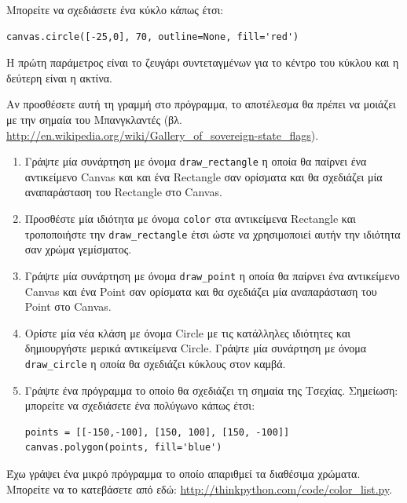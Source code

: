 \documentclass[10pt]{book}
\begin{document}
\begin{exercise}
Μπορείτε να σχεδιάσετε ένα κύκλο κάπως έτσι: 

\begin{verbatim}
canvas.circle([-25,0], 70, outline=None, fill='red')
\end{verbatim}

Η πρώτη παράμετρος είναι το ζευγάρι συντεταγμένων για το κέντρο του κύκλου και η δεύτερη είναι η ακτίνα.

Αν προσθέσετε αυτή τη γραμμή στο πρόγραμμα, το αποτέλεσμα θα πρέπει να μοιάζει με την σημαία του Μπανγκλαντές
(βλ. \url{http://en.wikipedia.org/wiki/Gallery_of_sovereign-state_flags}).


\begin{enumerate}

\item Γράψτε μία συνάρτηση με όνομα \verb"draw_rectangle" η οποία θα παίρνει ένα αντικείμενο Canvas και
  και ένα Rectangle σαν ορίσματα και θα σχεδιάζει μία αναπαράσταση του Rectangle στο Canvas. 
   
\item Προσθέστε μία ιδιότητα με όνομα {\tt color} στα αντικείμενα Rectangle και τροποποιήστε την  
  \verb"draw_rectangle" έτσι ώστε να χρησιμοποιεί αυτήν την ιδιότητα σαν χρώμα γεμίσματος.
  
\item Γράψτε μία συνάρτηση με όνομα \verb"draw_point" η οποία θα παίρνει ένα αντικείμενο Canvas και ένα
    Point σαν ορίσματα και θα σχεδιάζει μία αναπαράσταση του Point στο Canvas.  

\item Ορίστε μία νέα κλάση με όνομα Circle με τις κατάλληλες ιδιότητες και δημιουργήστε μερικά αντικείμενα
  Circle. Γράψτε μία συνάρτηση με όνομα \verb"draw_circle" η οποία θα σχεδιάζει κύκλους στον καμβά.

\item Γράψτε ένα πρόγραμμα το οποίο θα σχεδιάζει τη σημαία της Τσεχίας.
  Σημείωση: μπορείτε να σχεδιάσετε ένα πολύγωνο κάπως έτσι:

\begin{verbatim}
points = [[-150,-100], [150, 100], [150, -100]]
canvas.polygon(points, fill='blue')
\end{verbatim}

\end{enumerate}

Έχω γράψει ένα μικρό πρόγραμμα το οποίο απαριθμεί τα διαθέσιμα χρώματα. Μπορείτε να το κατεβάσετε από εδώ:
\url{http://thinkpython.com/code/color_list.py}. 

\end{exercise}
\end{document}
